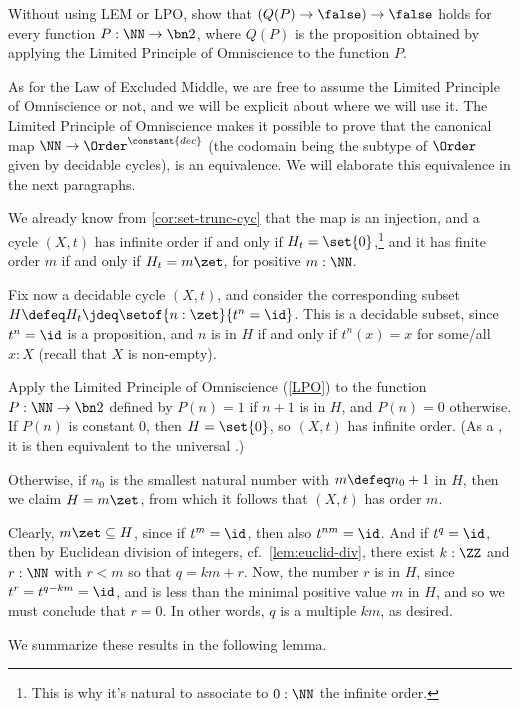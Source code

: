 \begin{xca}\label{xca:not-not-lpoP}
  Without using LEM or LPO, show that $(Q(P)\to\false)\to\false$ holds
  for every function $P:\NN\to\bn 2$, where $Q(P)$ is the proposition obtained
  by applying the Limited Principle of Omniscience to the function $P$.
\end{xca}

As for the Law of Excluded Middle, we are free to assume the Limited Principle of Omniscience
or not, and we will be explicit about where we will use it.
The Limited Principle of Omniscience makes it possible to prove that the canonical map
$\NN \to \Order^{\constant{dec}}$
(the codomain being the subtype of $\Order$ given by decidable cycles),
is an equivalence.
We will elaborate this equivalence in the next paragraphs.

We already know from \cref{cor:set-trunc-cyc} that the map is an injection,
and a cycle $(X,t)$ has infinite order
if and only if $H_t=\set{0}$,\footnote{%
  This is why it's natural to associate to $0:\NN$
  the infinite order.}
and it has finite order $m$
if and only if $H_t=m\zet$, for positive $m:\NN$.

Fix now a decidable cycle $(X,t)$,
and consider the corresponding subset $H \defeq H_t \jdeq \setof{n:\zet}{t^n=\id}$.
This is a decidable subset, since $t^n=\id$ is a proposition, and $n$ is in $H$
if and only if $t^n(x)=x$ for some/all $x:X$ (recall that $X$ is non-empty).

Apply the Limited Principle of Omniscience (\cref{LPO}) to the function $P:\NN\to\bn 2$ defined
by $P(n)=1$ if $n+1$ is in $H$, and $P(n)=0$ otherwise.
If $P(n)$ is constant $0$, then $H=\set{0}$,
so $(X,t)$ has infinite order.
(As a \covering, it is then equivalent to the universal \covering.)

Otherwise, if $n_0$ is the smallest natural number with $m\defeq n_0+1$ in $H$,
then we claim $H=m\zet$,
from which it follows that $(X,t)$ has order $m$.

Clearly, $m\zet \subseteq H$, since if $t^m=\id$, then also $t^{nm}=\id$.
And if $t^q=\id$, then by Euclidean division of integers, 
cf.~\cref{lem:euclid-div},
there exist $k:\ZZ$ and $r:\NN$ with $r<m$ so that $q=km+r$.
Now, the number $r$ is in $H$, since $t^r=t^{q-km}=\id$,
and is less than the minimal positive value $m$ in $H$,
and so we must conclude that $r=0$.
In other words, $q$ is a multiple $km$, as desired.

We summarize these results in the following lemma.

